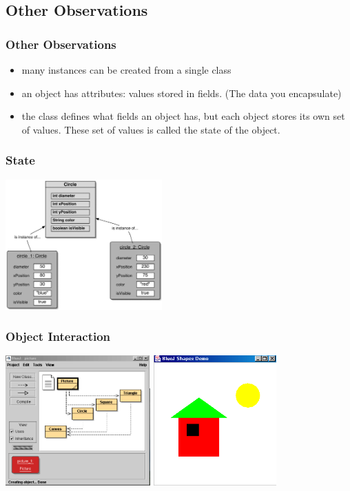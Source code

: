 \subsection{Other Observations}

\begin{frame}
\frametitle{Other Observations}
\begin{itemize}
\item many \alert{instances} can be created from a single class
\item an object has \alert{attributes}: values stored in \alert{fields}. (The data you encapsulate)
\item the class defines what fields an object has, but each object stores its own set of values.
These set of values is called the \alert{state} of the object.
\end{itemize}
\end{frame}

\begin{frame}
\frametitle{State}
\begin{center}
\includegraphics[height=5cm,keepaspectratio]{./figures/state}
\end{center}
\end{frame}




\begin{frame}
\frametitle{Object Interaction}
\begin{center}
\includegraphics[height=5cm,keepaspectratio]{./figures/diagram}
\mbox{\hspace{0.1cm}}
\includegraphics[height=5cm,keepaspectratio]{./figures/picture}
\end{center}
\end{frame}

